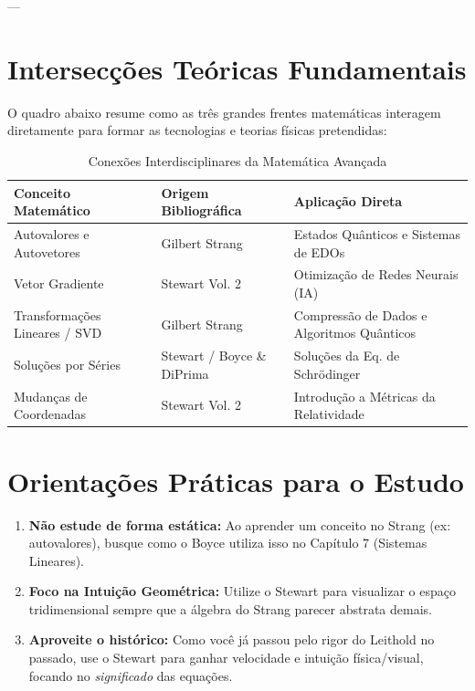 \documentclass[11pt,a4paper]{article}
\begin{document}
---

\section{Intersecções Teóricas Fundamentais}
O quadro abaixo resume como as três grandes frentes matemáticas interagem diretamente para formar as tecnologias e teorias físicas pretendidas:

\vspace{0.3cm}
\begin{table}[h!]
\centering
\caption{Conexões Interdisciplinares da Matemática Avançada}
\vspace{0.2cm}
\begin{tabular}{lll}
\toprule
\textbf{Conceito Matemático} & \textbf{Origem Bibliográfica} & \textbf{Aplicação Direta} \\ \midrule
Autovalores e Autovetores & Gilbert Strang & Estados Quânticos e Sistemas de EDOs \\
Vetor Gradiente & Stewart Vol. 2 & Otimização de Redes Neurais (IA) \\
Transformações Lineares / SVD & Gilbert Strang & Compressão de Dados e Algoritmos Quânticos \\
Soluções por Séries & Stewart / Boyce \& DiPrima & Soluções da Eq. de Schrödinger \\
Mudanças de Coordenadas & Stewart Vol. 2 & Introdução a Métricas da Relatividade \\ \bottomrule
\end{tabular}
\end{table}

\section{Orientações Práticas para o Estudo}
\begin{enumerate}
    \item \textbf{Não estude de forma estática:} Ao aprender um conceito no Strang (ex: autovalores), busque como o Boyce utiliza isso no Capítulo 7 (Sistemas Lineares). 
    \item \textbf{Foco na Intuição Geométrica:} Utilize o Stewart para visualizar o espaço tridimensional sempre que a álgebra do Strang parecer abstrata demais.
    \item \textbf{Aproveite o histórico:} Como você já passou pelo rigor do Leithold no passado, use o Stewart para ganhar velocidade e intuição física/visual, focando no \textit{significado} das equações.
\end{enumerate}
\end{document}
